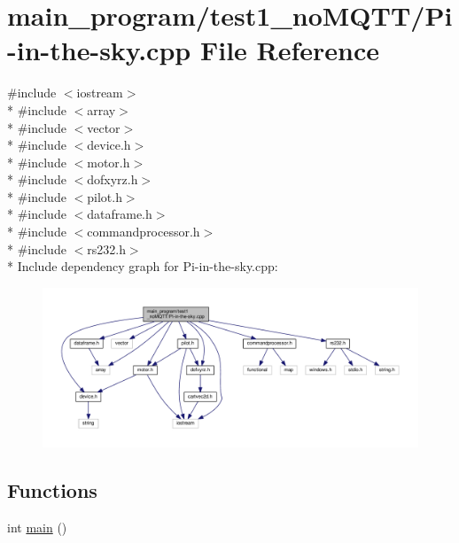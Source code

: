 \hypertarget{test1__no_m_q_t_t_2_pi-in-the-sky_8cpp}{}\section{main\+\_\+program/test1\+\_\+no\+M\+Q\+T\+T/\+Pi-\/in-\/the-\/sky.cpp File Reference}
\label{test1__no_m_q_t_t_2_pi-in-the-sky_8cpp}
{\ttfamily \#include $<$iostream$>$}\\*
{\ttfamily \#include $<$array$>$}\\*
{\ttfamily \#include $<$vector$>$}\\*
{\ttfamily \#include $<$device.\+h$>$}\\*
{\ttfamily \#include $<$motor.\+h$>$}\\*
{\ttfamily \#include $<$dofxyrz.\+h$>$}\\*
{\ttfamily \#include $<$pilot.\+h$>$}\\*
{\ttfamily \#include $<$dataframe.\+h$>$}\\*
{\ttfamily \#include $<$commandprocessor.\+h$>$}\\*
{\ttfamily \#include $<$rs232.\+h$>$}\\*
Include dependency graph for Pi-\/in-\/the-\/sky.cpp\+:\nopagebreak
\begin{figure}[H]
\begin{center}
\leavevmode
\includegraphics[width=350pt]{test1__no_m_q_t_t_2_pi-in-the-sky_8cpp__incl}
\end{center}
\end{figure}
\subsection*{Functions}
\begin{DoxyCompactItemize}
\item 
int \hyperlink{test1__no_m_q_t_t_2_pi-in-the-sky_8cpp_ae66f6b31b5ad750f1fe042a706a4e3d4}{main} ()
\end{DoxyCompactItemize}

